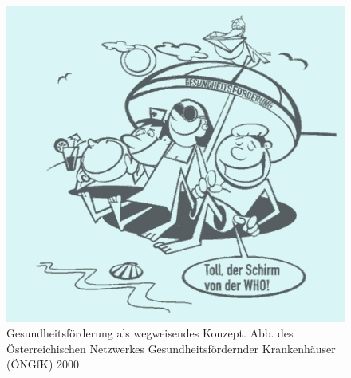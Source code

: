 \begin{figure}
	\vfill
	\centering
		\includegraphics{schirm.jpg}
	\caption{Gesundheitsförderung als wegweisendes Konzept. Abb. des Österreichischen Netzwerkes Gesundheitsfördernder Krankenhäuser (ÖNGfK) 2000}
	\label{fig:schirm}
	\vfill
\end{figure}
